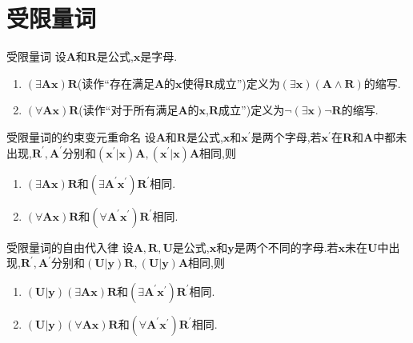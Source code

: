 \section{受限量词}

\begin{definition}{受限量词}{}
	设$\boldsymbol{A}$和$\boldsymbol{R}$是公式,$\boldsymbol{x}$是字母.
	\begin{enumerate}
		\item $\left(\exists\boldsymbol{A}\boldsymbol{x}\right)\boldsymbol{R}$(读作``存在满足$\boldsymbol{A}$的$\boldsymbol{x}$使得$\boldsymbol{R}$成立'')定义为$\left(\exists\boldsymbol{x}\right)\left(\boldsymbol{A}\wedge\boldsymbol{R}\right)$的缩写.
		\item $\left(\forall\boldsymbol{A}\boldsymbol{x}\right)\boldsymbol{R}$(读作``对于所有满足$\boldsymbol{A}$的$\boldsymbol{x}$,$\boldsymbol{R}$成立'')定义为$\neg\left(\exists\boldsymbol{x}\right)\neg\boldsymbol{R}$的缩写.
	\end{enumerate}
\end{definition}

\begin{metatheorem}{受限量词的约束变元重命名}{}
	设$\boldsymbol{A}$和$\boldsymbol{R}$是公式,$\boldsymbol{x}$和$\boldsymbol{x}^{\prime}$是两个字母,若$\boldsymbol{x}^{\prime}$在$\boldsymbol{R}$和$\boldsymbol{A}$中都未出现,$\boldsymbol{R}^{\prime},\boldsymbol{A}^{\prime}$分别和$\left(\boldsymbol{x}^{\prime}|\boldsymbol{x}\right)\boldsymbol{A},\left(\boldsymbol{x}^{\prime}|\boldsymbol{x}\right)\boldsymbol{A}$相同,则
	\begin{enumerate}
		\item $\left(\exists\boldsymbol{A}\boldsymbol{x}\right)\boldsymbol{R}$和$\left(\exists\boldsymbol{A}^{\prime}\boldsymbol{x}^{\prime}\right)\boldsymbol{R}^{\prime}$相同.
		\item $\left(\forall\boldsymbol{A}\boldsymbol{x}\right)\boldsymbol{R}$和$\left(\forall\boldsymbol{A}^{\prime}\boldsymbol{x}^{\prime}\right)\boldsymbol{R}^{\prime}$相同.
	\end{enumerate}
\end{metatheorem}

\begin{metatheorem}{受限量词的自由代入律}{}
	设$\boldsymbol{A},\boldsymbol{R},\boldsymbol{U}$是公式,$\boldsymbol{x}$和$\boldsymbol{y}$是两个不同的字母.若$\boldsymbol{x}$未在$\boldsymbol{U}$中出现,$\boldsymbol{R}^{\prime},\boldsymbol{A}^{\prime}$分别和$\left(\boldsymbol{U}|\boldsymbol{y}\right)\boldsymbol{R},\left(\boldsymbol{U}|\boldsymbol{y}\right)\boldsymbol{A}$相同,则
	\begin{enumerate}
		\item $\left(\boldsymbol{U}|\boldsymbol{y}\right)\left(\exists\boldsymbol{A}\boldsymbol{x}\right)\boldsymbol{R}$和$\left(\exists\boldsymbol{A}^{\prime}\boldsymbol{x}^{\prime}\right)\boldsymbol{R}^{\prime}$相同.
		\item $\left(\boldsymbol{U}|\boldsymbol{y}\right)\left(\forall\boldsymbol{A}\boldsymbol{x}\right)\boldsymbol{R}$和$\left(\forall\boldsymbol{A}^{\prime}\boldsymbol{x}^{\prime}\right)\boldsymbol{R}^{\prime}$相同.
	\end{enumerate}
\end{metatheorem}

